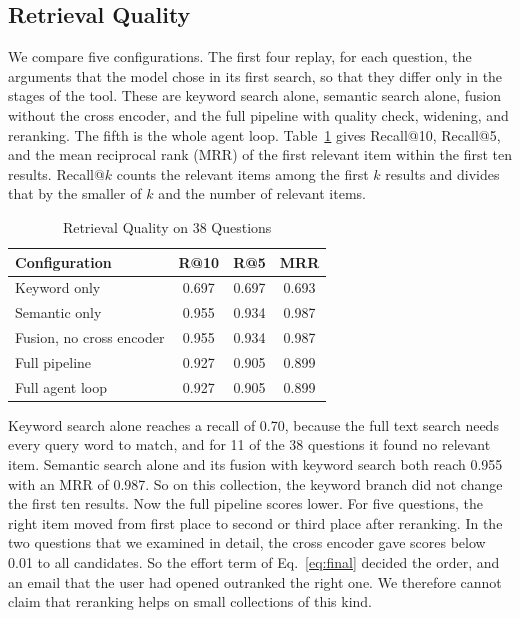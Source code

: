 \documentclass[conference]{IEEEtran}
\begin{document}
\subsection{Retrieval Quality}
We compare five configurations. The first four replay, for each question, the arguments that the model chose in its first search, so that they differ only in the stages of the tool. These are keyword search alone, semantic search alone, fusion without the cross encoder, and the full pipeline with quality check, widening, and reranking. The fifth is the whole agent loop. Table~\ref{tab:results} gives Recall@10, Recall@5, and the mean reciprocal rank (MRR) of the first relevant item within the first ten results. Recall@$k$ counts the relevant items among the first $k$ results and divides that by the smaller of $k$ and the number of relevant items.

\begin{table}[t]
\caption{Retrieval Quality on 38 Questions}
\label{tab:results}
\centering
\renewcommand{\arraystretch}{1.05}
\begin{tabular}{|l|c|c|c|}
\hline
\textbf{Configuration} & \textbf{R@10} & \textbf{R@5} & \textbf{MRR} \\
\hline
Keyword only & 0.697 & 0.697 & 0.693 \\
\hline
Semantic only & 0.955 & 0.934 & 0.987 \\
\hline
Fusion, no cross encoder & 0.955 & 0.934 & 0.987 \\
\hline
Full pipeline & 0.927 & 0.905 & 0.899 \\
\hline
Full agent loop & 0.927 & 0.905 & 0.899 \\
\hline
\end{tabular}
\end{table}

Keyword search alone reaches a recall of 0.70, because the full text search needs every query word to match, and for 11 of the 38 questions it found no relevant item. Semantic search alone and its fusion with keyword search both reach 0.955 with an MRR of 0.987. So on this collection, the keyword branch did not change the first ten results. Now the full pipeline scores lower. For five questions, the right item moved from first place to second or third place after reranking. In the two questions that we examined in detail, the cross encoder gave scores below 0.01 to all candidates. So the effort term of Eq.~\eqref{eq:final} decided the order, and an email that the user had opened outranked the right one. We therefore cannot claim that reranking helps on small collections of this kind.
\end{document}
